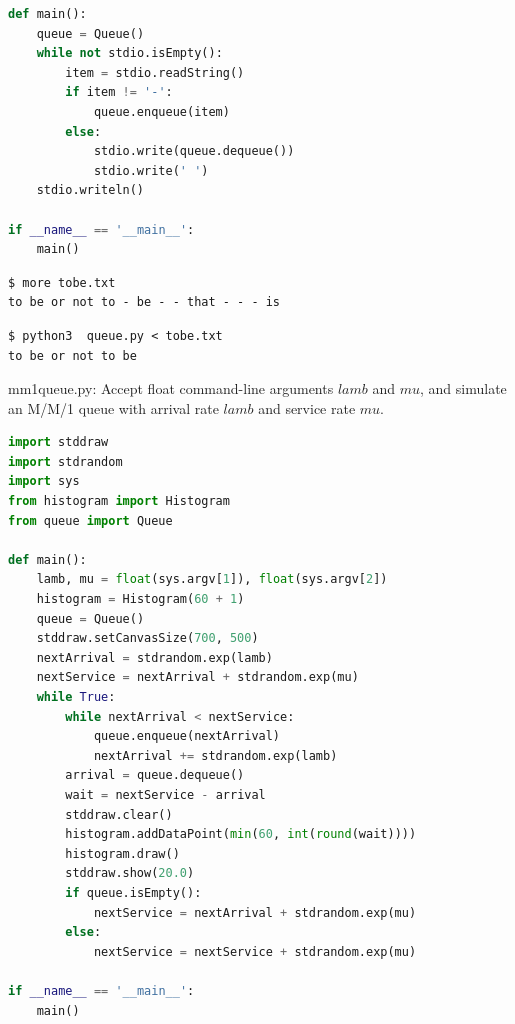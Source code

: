 \documentclass[8pt,a4paper,compress]{beamer}
\begin{document}
\begin{frame}[fragile]
\pause

\begin{lstlisting}[language=python,style=focusin]
def main():
    queue = Queue()
    while not stdio.isEmpty():
        item = stdio.readString()
        if item != '-':
            queue.enqueue(item)
        else:
            stdio.write(queue.dequeue())
            stdio.write(' ')
    stdio.writeln()

if __name__ == '__main__':
    main()
\end{lstlisting}

\pause

\begin{lstlisting}[language={},style=focusin]
$ more tobe.txt
to be or not to - be - - that - - - is
\end{lstlisting}

\pause

\begin{lstlisting}[language={},style=focusin]
$ python3  queue.py < tobe.txt
to be or not to be
\end{lstlisting}
\end{frame}

\begin{frame}[fragile]
\pause

\begin{framed}
\tiny mm1queue.py: Accept float command-line arguments $lamb$ and $mu$, and simulate an M/M/1 queue with arrival rate $lamb$ and service rate $mu$.
\end{framed}

\begin{lstlisting}[language=python,style=focusin]
import stddraw
import stdrandom
import sys
from histogram import Histogram
from queue import Queue

def main():
    lamb, mu = float(sys.argv[1]), float(sys.argv[2])
    histogram = Histogram(60 + 1)
    queue = Queue()
    stddraw.setCanvasSize(700, 500)
    nextArrival = stdrandom.exp(lamb)
    nextService = nextArrival + stdrandom.exp(mu) 
    while True:
        while nextArrival < nextService:
            queue.enqueue(nextArrival)
            nextArrival += stdrandom.exp(lamb)
        arrival = queue.dequeue()
        wait = nextService - arrival
        stddraw.clear()
        histogram.addDataPoint(min(60, int(round(wait))))
        histogram.draw()
        stddraw.show(20.0)
        if queue.isEmpty():
            nextService = nextArrival + stdrandom.exp(mu)
        else:
            nextService = nextService + stdrandom.exp(mu)

if __name__ == '__main__':
    main()

\end{lstlisting}
\end{frame}
\end{document}
